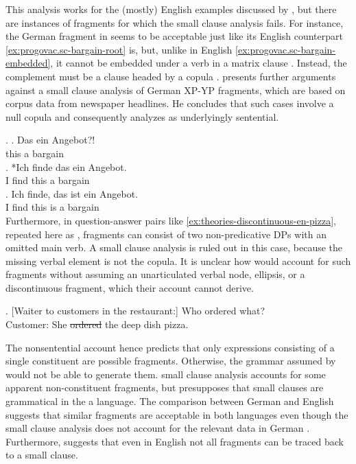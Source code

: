 This analysis works for the (mostly) English examples discussed by \citet{progovac2006}, but there are instances of fragments for which the small clause analysis fails. For instance, the German fragment in \Next[a] seems to be acceptable just like its English counterpart \ref{ex:progovac.sc-bargain-root} is, but, unlike in English \ref{ex:progovac.sc-bargain-embedded}, it cannot be embedded under a verb in a matrix clause \Next[b]. Instead, the complement must be a clause headed by a copula \Next[c]. \citet{reich2017} presents further arguments against a small clause analysis of German XP-YP fragments, which are based on corpus data from newspaper headlines. He concludes that such cases involve a null copula and consequently analyzes \Next[a] as underlyingly sentential.

\ex. \ag. Das ein Angebot?!\\ 
	  this a bargain\\
     \bg. *Ich finde das ein Angebot.\\
	 I find this a bargain\\
    \cg. Ich finde, das ist ein Angebot.\\
	I find this is a bargain\\

Furthermore, in question-answer pairs like \ref{ex:theories-discontinuous-en-pizza}, repeated here as \Next, fragments can consist of two non-predicative DPs with an omitted main verb. A small clause analysis is ruled out in this case, because the missing verbal element is not the copula. It is unclear how \citet{barton.progovac2005} would account for such fragments without assuming an unarticulated verbal node, ellipsis, or a discontinuous fragment, which their account cannot derive.
 
\ex. [Waiter to customers in the restaurant:] Who ordered what?\\
Customer: She \sout{ordered} the deep dish pizza. 

\largerpage
The nonsentential account hence predicts that only expressions consisting of a single constituent are possible fragments. Otherwise, the grammar assumed by \citet{barton.progovac2005} would not be able to generate them.  small clause analysis accounts for some apparent non-constituent fragments, but presupposes that small clauses are grammatical in the a language. The comparison between German and English suggests that similar fragments are acceptable in both languages even though the small clause analysis does not account for the relevant data in German \citep{reich2017}. Furthermore, \Last suggests that even in English not all fragments can be traced back to a small clause.

